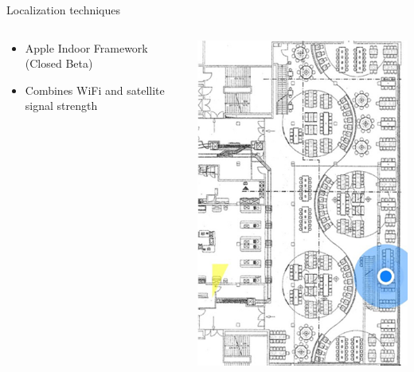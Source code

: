 \documentclass[11pt]{beamer}
\begin{document}
\begin{frame}{Localization techniques}
\begin{columns}
    \begin{column}{0.65\textwidth}

      \begin{itemize}
        \setlength{\itemsep}{1.5ex}
        \item Apple Indoor Framework (Closed Beta)
        \item Combines WiFi and satellite signal strength
      \end{itemize}

    \end{column}

    \hfill

    \begin{column}{0.25\textwidth}
      \includegraphics[width=\textwidth]{appleframework}
    \end{column}

  \end{columns}

\end{frame}
\end{document}
